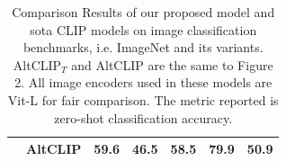 \begin{table}[thbp]
\begin{tabular}{clccccc}
                           & AltCLIP                                      & \textbf{59.6}     &46.5             & \textbf{58.5}       & \textbf{79.9}       &\textbf {50.9}         \\
\hline
\end{tabular}
\caption{Comparison Results of our proposed model and sota CLIP models on image classification benchmarks, i.e. ImageNet and its variants. AltCLIP$_{T}$ and AltCLIP are the same to Figure 2. All image encoders used in these models are Vit-L for fair comparison. The metric reported is zero-shot classification accuracy.}
\label{tab:imagenet}
\end{table}